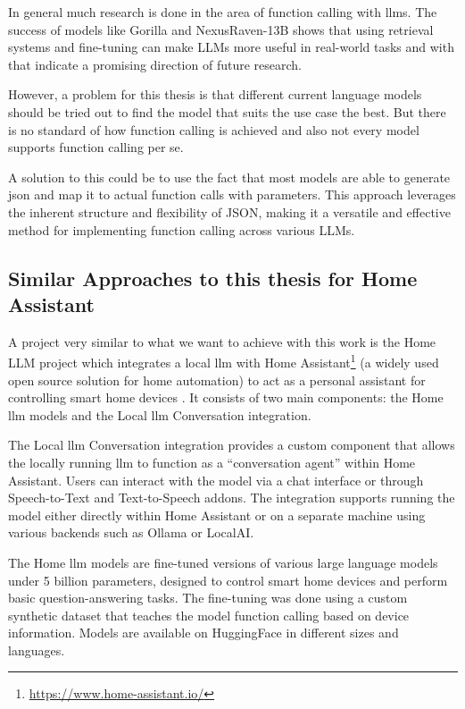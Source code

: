 In general much research is done in the area of function calling with \glspl{llm}.
The success of models like Gorilla and NexusRaven-13B shows that using retrieval systems and fine-tuning can make LLMs more useful in real-world tasks and with that indicate a promising direction of future research.

However, a problem for this thesis is that different current language models should be tried out to find the model that suits the use case the best. But there is no standard of how function calling is achieved and also not every model supports function calling per se.

A solution to this could be to use the fact that most models are able to generate \gls{json} and map it to actual function calls with parameters. This approach leverages the inherent structure and flexibility of JSON, making it a versatile and effective method for implementing function calling across various LLMs.

\subsection{Similar Approaches to this thesis for Home Assistant}
A project very similar to what we want to achieve with this work is the Home LLM project which integrates a local \gls{llm} with Home Assistant\footnote{\url{https://www.home-assistant.io/}} (a widely used open source solution for home automation) to act as a personal assistant for controlling smart home devices \cite{acon96_home_llm}. It consists of two main components: the Home \gls{llm} models and the Local \gls{llm} Conversation integration.

The Local \gls{llm} Conversation integration provides a custom component that allows the locally running \gls{llm} to function as a ``conversation agent'' within Home Assistant. Users can interact with the model via a chat interface or through Speech-to-Text and Text-to-Speech addons. The integration supports running the model either directly within Home Assistant or on a separate machine using various backends such as Ollama or LocalAI.

The Home \gls{llm} models are fine-tuned versions of various large language models under 5 billion parameters, designed to control smart home devices and perform basic question-answering tasks. The fine-tuning was done using a custom synthetic dataset that teaches the model function calling based on device information. Models are available on HuggingFace in different sizes and languages.

